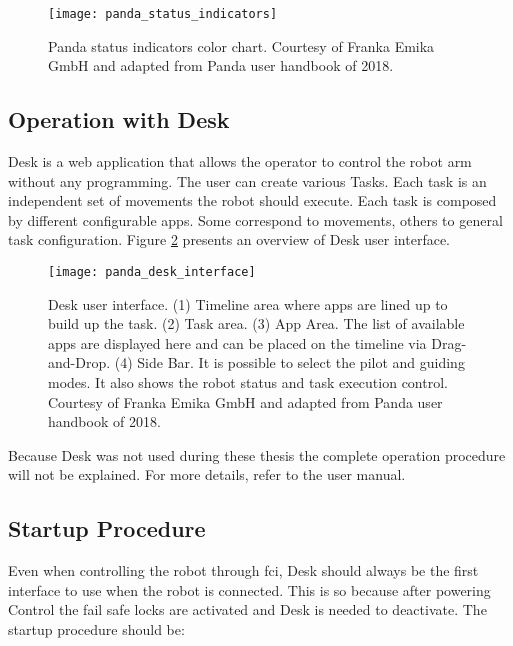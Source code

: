 \begin{figure}[htbp]
    \centering
	\texttt{[image: panda\_status\_indicators]}
	\caption{Panda status indicators color chart. Courtesy of Franka Emika GmbH and adapted from Panda user handbook of 2018.}
	\label{fig:panda_status_indicators}
\end{figure}



\subsection{Operation with Desk}
\label{subsec:robotic_system_operation_desk}

Desk is a web application that allows the operator to control the robot arm without any programming. The user can create various Tasks. Each task is an independent set of movements the robot should execute. Each task is composed by different configurable apps. Some correspond to movements, others to general task configuration. Figure \ref{fig:panda_desk_interface} presents an overview of Desk user interface.

\begin{figure}[htbp]
    \centering
	\texttt{[image: panda\_desk\_interface]}
	\caption{Desk user interface. (1) Timeline area where apps are lined up to build up the task. (2) Task area. (3) App Area. The list of available apps are displayed here and can be placed on the timeline via Drag-and-Drop. (4) Side Bar. It is possible to select the pilot and guiding modes. It also shows the robot status and task execution control. Courtesy of Franka Emika GmbH and adapted from Panda user handbook of 2018.}
	\label{fig:panda_desk_interface}
\end{figure}

Because Desk was not used during these thesis the complete operation procedure will not be explained. For more details, refer to the user manual.



\subsection{Startup Procedure}
\label{subsec:robotic_system_operation_startup}

Even when controlling the robot through \gls{fci}, Desk should always be the first interface to use when the robot is connected. This is so because after powering Control the fail safe locks are activated and Desk is needed to deactivate. The startup procedure should be:


